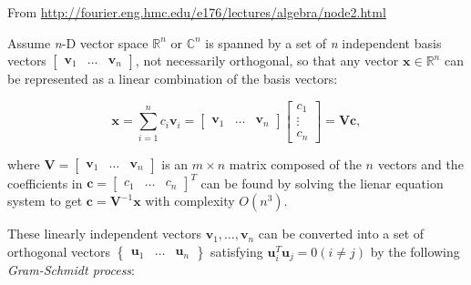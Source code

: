 \documentclass[10pt,b5paper,titlepage]{book}
\begin{document}
From \url{http://fourier.eng.hmc.edu/e176/lectures/algebra/node2.html}

Assume \textit{n}-D vector space $\mathbb{R}^{n}$ or $\mathbb{C}^{n}$ is spanned
by a set of \textit{n} independent basis vectors $\begin{bmatrix} \mathbf{v}_1 & \ldots & \mathbf{v}_n \end{bmatrix}$,
not necessarily orthogonal, so that any vector $\mathbf{x} \in \mathbb{R}^{n}$
can be represented as a linear combination of the basis vectors:

\begin{equation}
    \mathbf{x}
    = \sum_{i=1}^{n} c_{i} \mathbf{v}_{i}
    = \begin{bmatrix} \mathbf{v}_1 & \ldots & \mathbf{v}_n \end{bmatrix}
    \begin{bmatrix} c_1\\ \vdots\\ c_n \end{bmatrix}
    = \mathbf{V} \mathbf{c}
,\end{equation}

where $\mathbf{V} = \begin{bmatrix} \mathbf{v}_1 & \ldots & \mathbf{v}_n \end{bmatrix}$ is an
$m \times n$ matrix composed of the $n$ vectors and the coefficients in
$\mathbf{c} = \begin{bmatrix} c_1 & \ldots & c_n \end{bmatrix}^{T}$ can be
found by solving the lienar equation system to get
$\mathbf{c} = \mathbf{V}^{-1}\mathbf{x}$ with complexity $\mathit{O}(n^{3})$.

These linearly independent vectors $\mathbf{v}_{1}, \ldots, \mathbf{v}_{n}$ can be
converted into a set of orthogonal vectors $\begin{Bmatrix} \mathbf{u}_1 & \ldots & \mathbf{u}_n \end{Bmatrix}$
satisfying $\mathbf{u}_{i}^{T}\mathbf{u}_{j} = 0 (i \neq j)$ by the following
\textit{Gram-Schmidt process}:
\end{document}
